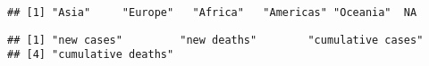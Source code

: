 \documentclass[]{article}
\newenvironment{Shaded}{\begin{snugshade}}{\end{snugshade}}
\newcommand{\KeywordTok}[1]{\textcolor[rgb]{0.13,0.29,0.53}{\textbf{#1}}}
\newcommand{\NormalTok}[1]{#1}
\newcommand{\OperatorTok}[1]{\textcolor[rgb]{0.81,0.36,0.00}{\textbf{#1}}}
\newcommand{\StringTok}[1]{\textcolor[rgb]{0.31,0.60,0.02}{#1}}
\begin{document}
\begin{verbatim}
## [1] "Asia"     "Europe"   "Africa"   "Americas" "Oceania"  NA
\end{verbatim}

\begin{Shaded}
\end{Shaded}

\begin{verbatim}
## [1] "new cases"         "new deaths"        "cumulative cases" 
## [4] "cumulative deaths"
\end{verbatim}
\end{document}
